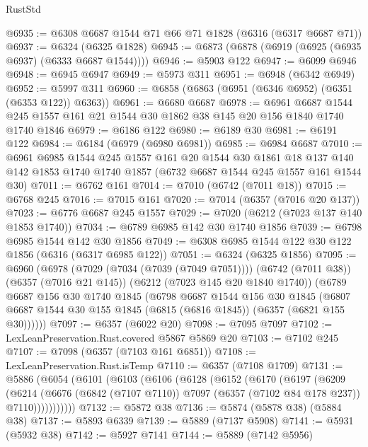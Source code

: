 \begin{lexlean}{RustStd}
\begin{coremodule}
@6935 := @6308 @6687 @1544 @71 @66 @71 @1828 (@6316 (@6317 @6687 @71))
@6937 := @6324 (@6325 @1828)
@6945 := @6873 (@6878 (@6919 (@6925 (@6935 @6937) (@6333 @6687 @1544))))
@6946 := @5903 @122
@6947 := @6099 @6946
@6948 := @6945 @6947
@6949 := @5973 @311
@6951 := @6948 (@6342 @6949)
@6952 := @5997 @311
@6960 := @6858 (@6863 (@6951 (@6346 @6952) (@6351 (@6353 @122)) @6363))
@6961 := @6680 @6687
@6978 := @6961
    @6687
    @1544
    @245
    @1557
    @161
    @21
    @1544
    @30
    @1862
    @38
    @145
    @20
    @156
    @1840
    @1740
    @1740
    @1846
@6979 := @6186 @122
@6980 := @6189 @30
@6981 := @6191 @122
@6984 := @6184 (@6979 (@6980 @6981))
@6985 := @6984 @6687
@7010 := @6961
    @6985
    @1544
    @245
    @1557
    @161
    @20
    @1544
    @30
    @1861
    @18
    @137
    @140
    @142
    @1853
    @1740
    @1740
    @1857
    (@6732 @6687 @1544 @245 @1557 @161 @1544 @30)
@7011 := @6762 @161
@7014 := @7010 (@6742 (@7011 @18))
@7015 := @6768 @245
@7016 := @7015 @161
@7020 := @7014 (@6357 (@7016 @20 @137))
@7023 := @6776 @6687 @245 @1557
@7029 := @7020 (@6212 (@7023 @137 @140 @1853 @1740))
@7034 := @6789 @6985 @142 @30 @1740 @1856
@7039 := @6798 @6985 @1544 @142 @30 @1856
@7049 := @6308 @6985 @1544 @122 @30 @122 @1856 (@6316 (@6317 @6985 @122))
@7051 := @6324 (@6325 @1856)
@7095 := @6960
    (@6978
      (@7029 (@7034 (@7039 (@7049 @7051))))
      (@6742 (@7011 @38))
      (@6357 (@7016 @21 @145))
      (@6212 (@7023 @145 @20 @1840 @1740))
      (@6789
        @6687
        @156
        @30
        @1740
        @1845
        (@6798
          @6687
          @1544
          @156
          @30
          @1845
          (@6807 @6687 @1544 @30 @155 @1845 (@6815 (@6816 @1845)) (@6357 (@6821 @155 @30))))))
@7097 := @6357 (@6022 @20)
@7098 := @7095 @7097
@7102 := LexLeanPreservation.Rust.covered @5867 @5869 @20
@7103 := @7102 @245
@7107 := @7098 (@6357 (@7103 @161 @6851))
@7108 := LexLeanPreservation.Rust.isTemp
@7110 := @6357 (@7108 @1709)
@7131 := @5886
    (@6054
      (@6101
        (@6103
          (@6106
            (@6128
              (@6152
                (@6170
                  (@6197
                    (@6209
                      (@6214
                        (@6676
                          (@6842 (@7107 @7110))
                          @7097
                          (@6357 (@7102 @84 @178 @237))
                          @7110)))))))))))
@7132 := @5872 @38
@7136 := @5874 (@5878 @38) (@5884 @38)
@7137 := @5893 @6339
@7139 := @5889 (@7137 @5908)
@7141 := @5931 (@5932 @38)
@7142 := @5927 @7141
@7144 := @5889 (@7142 @5956)

\end{coremodule}
\end{lexlean}
